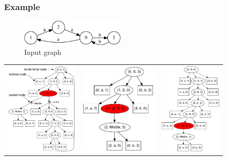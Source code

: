 \documentclass[xcolor=table]{beamer}
\begin{document}
\begin{frame}
  \transwipe[direction=90]
  \frametitle{Example}
\begin{figure}[ht]
    \centering
        \includegraphics[width=0.45\textwidth]{pictures/input.pdf} \\
        Input graph
\end{figure}

\begin{overprint}

\begin{tabular}{  c  c  c  }
    \includegraphics[height=4.5cm]{pictures/AnBn.pdf}
    &
    \includegraphics[height=4.5cm]{pictures/AnBn_2.pdf}

    &
    \includegraphics[height=4.5cm]{pictures/AnBn_1.pdf}


\end{tabular}
\end{overprint}
\end{frame}
\end{document}
